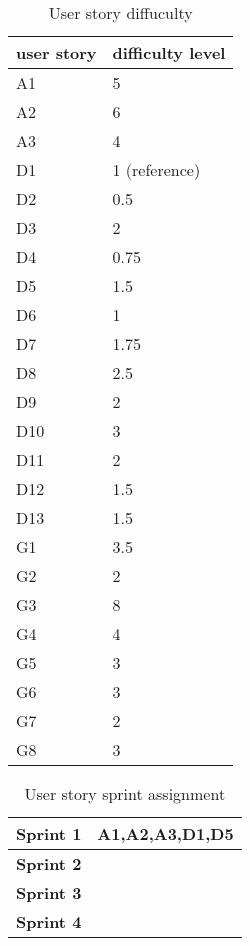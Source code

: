 


\begin{table}
\begin{tabular}{ | l | l | }
  \hline
  \textbf{user story} & \textbf{difficulty level} \\ \hline
  A1 & 5 \\ \hline
  A2 & 6 \\ \hline
  A3 & 4 \\ \hline
  D1 & 1 (reference) \\ \hline
  D2 & 0.5 \\ \hline
  D3 & 2 \\ \hline
  D4 & 0.75 \\ \hline
  D5 & 1.5 \\ \hline
  D6 & 1 \\ \hline
  D7 & 1.75 \\ \hline
  D8 & 2.5 \\ \hline
  D9 & 2 \\ \hline
  D10 & 3 \\ \hline
  D11 & 2 \\ \hline
  D12 & 1.5 \\ \hline
  D13 & 1.5 \\ \hline
  G1 & 3.5 \\ \hline
  G2 & 2 \\ \hline
  G3 & 8 \\ \hline
  G4 & 4 \\ \hline
  G5 & 3 \\ \hline
  G6 & 3 \\ \hline
  G7 & 2 \\ \hline
  G8 & 3 \\ \hline
\end{tabular}
\caption{User story diffuculty}
\end{table}


\begin{table}
\begin{tabular}{ | l | l | }
  \hline
  \textbf{Sprint 1} & A1,A2,A3,D1,D5 \\ \hline
  \textbf{Sprint 2} &  \\ \hline
  \textbf{Sprint 3} &  \\ \hline
  \textbf{Sprint 4} &  \\ \hline
\end{tabular}
\caption{User story sprint assignment}
\end{table}









